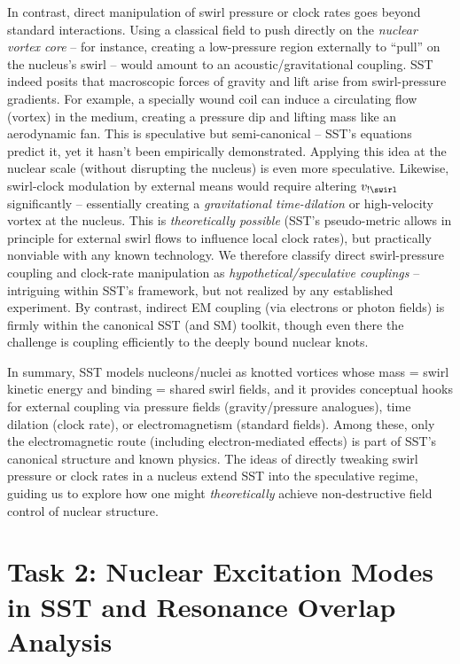 \documentclass[11pt]{article}
\begin{document}
In contrast, direct manipulation of swirl pressure or clock rates goes beyond standard interactions. Using a classical field to push directly on the \textit{nuclear vortex core} – for instance, creating a low-pressure region externally to “pull” on the nucleus’s swirl – would amount to an acoustic/gravitational coupling. SST indeed posits that macroscopic forces of gravity and lift arise from swirl-pressure gradients. For example, a specially wound coil can induce a circulating flow (vortex) in the medium, creating a pressure dip and lifting mass like an aerodynamic fan. This is speculative but semi-canonical – SST’s equations predict it, yet it hasn’t been empirically demonstrated. Applying this idea at the nuclear scale (without disrupting the nucleus) is even more speculative. Likewise, swirl-clock modulation by external means would require altering $v_{!\swirl}$ significantly – essentially creating a \textit{gravitational time-dilation} or high-velocity vortex at the nucleus. This is \textit{theoretically possible} (SST’s pseudo-metric allows in principle for external swirl flows to influence local clock rates), but practically nonviable with any known technology. We therefore classify direct swirl-pressure coupling and clock-rate manipulation as \textit{hypothetical/speculative couplings} – intriguing within SST’s framework, but not realized by any established experiment. By contrast, indirect EM coupling (via electrons or photon fields) is firmly within the canonical SST (and SM) toolkit, though even there the challenge is coupling efficiently to the deeply bound nuclear knots.


In summary, SST models nucleons/nuclei as knotted vortices whose mass = swirl kinetic energy and binding = shared swirl fields, and it provides conceptual hooks for external coupling via pressure fields (gravity/pressure analogues), time dilation (clock rate), or electromagnetism (standard fields). Among these, only the electromagnetic route (including electron-mediated effects) is part of SST’s canonical structure and known physics. The ideas of directly tweaking swirl pressure or clock rates in a nucleus extend SST into the speculative regime, guiding us to explore how one might \textit{theoretically} achieve non-destructive field control of nuclear structure.


\section*{Task 2: Nuclear Excitation Modes in SST and Resonance Overlap Analysis}
\end{document}
